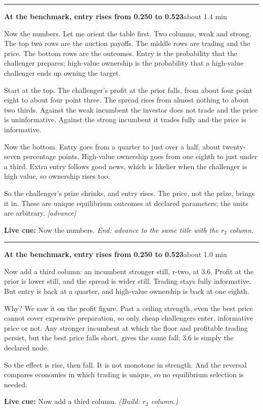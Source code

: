 \documentclass[11pt]{article}
\newcommand{\Advance}{\textcolor{ScriptGray}{\textit{[advance]}}}
\newcommand{\Cue}[1]{\par\nobreak\smallskip\noindent
  \textcolor{ScriptGray}{\footnotesize\textbf{Live cue:} #1}\par}
\newcommand{\scriptframe}[3]{%
  \Needspace{9\baselineskip}%
  \par\medskip\noindent\textcolor{ScriptBlue}{\rule{\linewidth}{0.55pt}}%
  \par\smallskip\noindent
  \textbf{#1}\hfill\textcolor{ScriptGray}{\small #2}\par\smallskip
  #3\par}
\begin{document}
\scriptframe{At the benchmark, entry rises from 0.250 to 0.523}{about 1.4 min}{%
  Now the numbers. Let me orient the table first. Two columns, weak and strong.
  The top two rows are the auction payoffs. The middle rows are trading and the
  price. The bottom rows are the outcomes. Entry is the probability that the
  challenger prepares; high-value ownership is the probability that a
  high-value challenger ends up owning the target.

  Start at the top. The challenger's profit at the prior falls, from about four
  point eight to about four point three. The spread rises from almost nothing
  to about two thirds.
  Against the weak incumbent the investor does not trade and the price is
  uninformative. Against the strong incumbent it trades fully and the price is
  informative.

  Now the bottom. Entry goes from a quarter to just over a half, about
  twenty-seven percentage points.
  High-value ownership goes from one eighth to just under a third.
  Extra entry follows good news, which is likelier when the challenger is high
  value, so ownership rises too.

  So the challenger's prize shrinks, and entry rises. The price, not the prize,
  brings it in. These are unique equilibrium outcomes at declared parameters;
  the units are arbitrary. \Advance
  \Cue{Now the numbers. \textit{End: advance to the same title with the $r_2$ column.}}
}

\scriptframe{At the benchmark, entry rises from 0.250 to 0.523}{about 1.0 min}{%
  Now add a third column: an incumbent stronger still, r-two, at 3.6.
  Profit at the prior is lower still, and the spread is wider still. Trading
  stays fully informative. But entry is back at a quarter, and high-value
  ownership is back at one eighth.

  Why? We saw it on the profit figure. Past a ceiling strength, even the best
  price cannot cover expensive preparation, so only cheap challengers enter,
  informative price or not. Any stronger incumbent at which the floor and
  profitable trading persist, but the best price falls short, gives the same
  fall; 3.6 is simply the declared node.

  So the effect is rise, then fall. It is not monotone in strength. And the
  reversal compares economies in which trading is unique, so no equilibrium
  selection is needed.
  \Cue{Now add a third column. \textit{(Build: $r_2$ column.)}}
}
\end{document}
